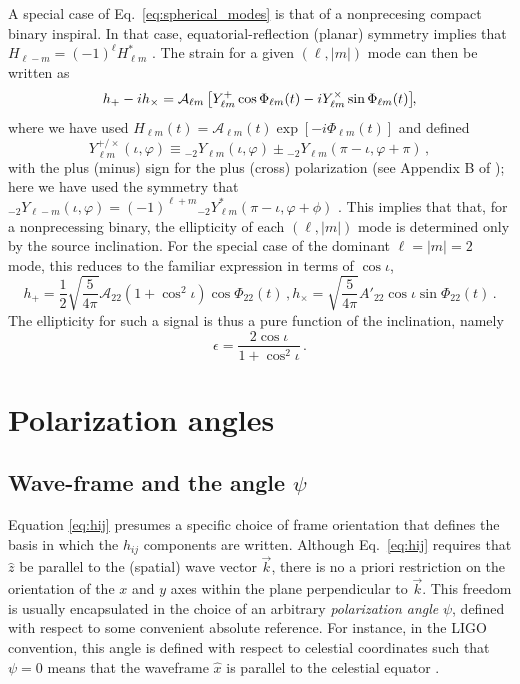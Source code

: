 \documentclass[aps,prd,twocolumn,superscriptaddress,preprintnumbers,floatfix,nofootinbib]{revtex4-2}
\newcommand{\beq}{\begin{equation}}
\newcommand{\eeq}{\end{equation}}
\newcommand*{\eq}[1]{Eq.~\eqref{eq:#1}}
\begin{document}
A special case of Eq.~\eqref{eq:spherical_modes} is that of a nonprecesing compact binary inspiral.
In that case, equatorial-reflection (planar) symmetry implies that $H_{\ell -m} = (-1)^\ell H_{\ell m}^*$ \cite{Faye:2012we}.
The strain for a given $(\ell, |m|)$ mode can then be written as
\begin{equation}
h_+ - i h_\times = \mathcal{A}_{\ell m} \left[ Y^+_{\ell m} \cos \Phi_{\ell m}(t) - 
i Y^\times_{\ell m} \sin \Phi_{\ell m}(t) \right]\hspace{-3pt} ,
\end{equation}
where we have used $H_{\ell m}(t) = \mathcal{A}_{\ell m}(t) \exp[-i \Phi_{\ell m}(t)]$ and defined
\begin{equation}
Y_{\ell m}^{+/\times}(\iota,\varphi) \equiv {}_{-2} Y_{\ell m}(\iota, \varphi) \pm {}_{-2} Y_{\ell m}(\pi-\iota, \varphi + \pi) \, ,
\end{equation}
with the plus (minus) sign for the plus (cross) polarization (see Appendix B of \cite{Isi:2021iql}); here we have used the symmetry that ${}_{-2} Y_{\ell -m}(\iota,\varphi) = (-1)^{\ell+m} {}_{-2} Y_{\ell m}^*(\pi-\iota,\varphi+\phi)$ \cite{goldberg:1967}.
This implies that that, for a nonprecessing binary, the ellipticity of each $(\ell, |m|)$ mode is determined only by the source inclination.
For the special case of the dominant $\ell=|m|=2$ mode, this reduces to the familiar expression in terms of $\cos\iota$,
\begin{subequations}
\beq
h_+ = \frac{1}{2} \sqrt{\frac{5}{4\pi}} \mathcal{A}_{22} \left(1 + \cos^2\iota\right) \cos \Phi_{22}(t) \, , 
\eeq
\beq
h_\times = \sqrt{\frac{5}{4\pi}} A'_{22}  \cos\iota \sin \Phi_{22}(t) \, .
\eeq
\end{subequations}
The ellipticity for such a signal is thus a pure function of the inclination, namely
\beq \label{eq:ellip_cosi}
\epsilon = \frac{2 \cos\iota}{1+\cos^2\iota}\, . 
\eeq


\section{Polarization angles}

\subsection{Wave-frame and the angle $\psi$}
\label{sec:pol}

Equation \eqref{eq:hij} presumes a specific choice of frame orientation that defines the basis in which the $h_{ij}$ components are written.
Although \eq{hij} requires that $\hat{z}$ be parallel to the (spatial) wave vector $\vec{k}$, there is no a priori restriction on the orientation of the $x$ and $y$ axes within the plane perpendicular to $\vec{k}$.
This freedom is usually encapsulated in the choice of an arbitrary \emph{polarization angle} $\psi$, defined with respect to some convenient absolute reference.
For instance, in the LIGO convention, this angle is defined with respect to celestial coordinates such that $\psi=0$ means that the waveframe $\hat{x}$ is parallel to the celestial equator \cite{LALSuite:wave}.
\end{document}
